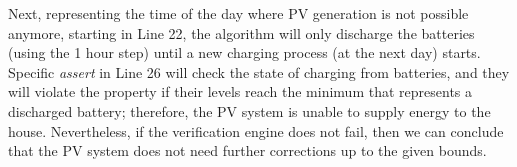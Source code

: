 \documentclass[runningheads]{llncs}
\begin{document}
Next, representing the time of the day where PV generation is not possible anymore, starting in Line 22, the algorithm will only discharge the batteries (using the 1 hour step) until a new charging process (at the next day) starts. Specific \textit{assert} in Line 26 will check the state of charging from batteries, and they will violate the property if their levels reach the minimum that represents a discharged battery; therefore, the PV system is unable to supply energy to the house. Nevertheless, if the verification engine does not fail, then we can conclude that the PV system does not need further corrections up to the given bounds.
%
\end{document}

